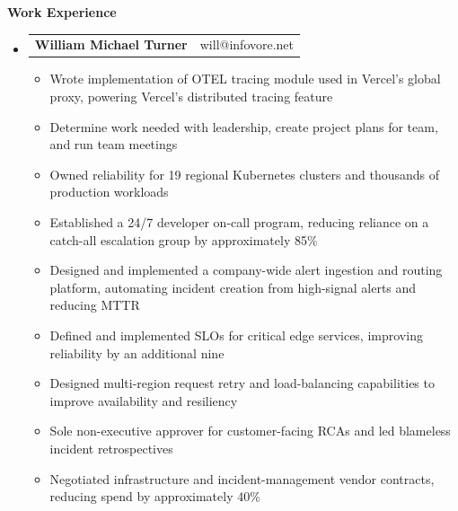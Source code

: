 \documentclass[letterpaper,11pt]{article}
\makeatletter
\newcommand{\resitem}[1]{\item #1 \vspace{-1pt}}
\newcommand{\resheading}[1]{{\large \color{white} \colorbox{myBlue}{\begin{minipage}{\textwidth}{\textbf{#1 \vphantom{p\^{E}}}}\end{minipage}}}}
\newcommand{\ressubheading}[4]{
\begin{tabular*}{7.3in}{l@{\extracolsep{\fill}}r} \color{myRed}
\textbf{\large William Michael Turner} & will@infovore.net \\
\end{tabular*}\vspace{-5pt}}
\makeatother
\begin{document}
\resheading{Work Experience}
\begin{itemize}
\item[]
        \ressubheading{Vercel}{Remote}{Team Leader/Site Reliability Engineer}{March 2024 - January 2026}
            \begin{itemize}
                \resitem{Wrote implementation of OTEL tracing module used in Vercel's global proxy, powering Vercel's distributed tracing feature}
                \resitem{Determine work needed with leadership, create project plans for team, and run team meetings}
                \resitem{Owned reliability for 19 regional Kubernetes clusters and thousands of production workloads}
                \resitem{Established a 24/7 developer on-call program, reducing reliance on a catch-all escalation group by approximately 85\%}
                \resitem{Designed and implemented a company-wide alert ingestion and routing platform, automating incident creation from high-signal alerts and reducing MTTR}
                \resitem{Defined and implemented SLOs for critical edge services, improving reliability by an additional nine}
                 \resitem{Designed multi-region request retry and load-balancing capabilities to improve availability and resiliency}
                \resitem{Sole non-executive approver for customer-facing RCAs and led blameless incident retrospectives}
                \resitem{Negotiated infrastructure and incident-management vendor contracts, reducing spend by approximately 40\%}
            \end{itemize}


\end{itemize}
\end{document}
